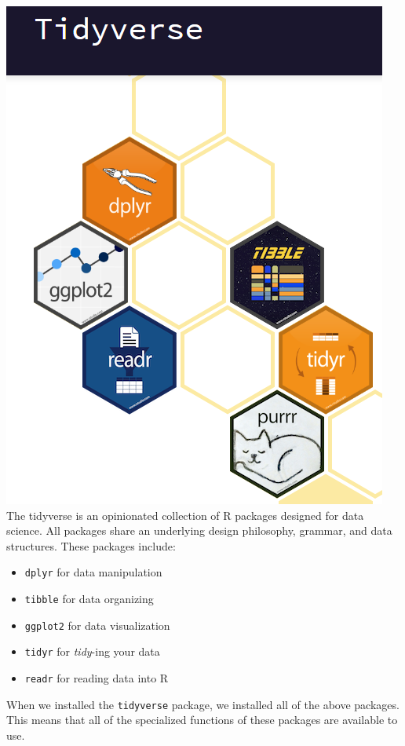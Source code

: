 \documentclass[]{book}
\providecommand{\tightlist}{%
  \setlength{\itemsep}{0pt}\setlength{\parskip}{0pt}}
\begin{document}
\includegraphics{./figures/tidyverse.png}
The tidyverse is an opinionated collection of R packages designed for data science. All packages share an underlying design philosophy, grammar, and data structures. These packages include:

\begin{itemize}
\tightlist
\item
  \texttt{dplyr} for data manipulation
\item
  \texttt{tibble} for data organizing
\item
  \texttt{ggplot2} for data visualization
\item
  \texttt{tidyr} for \emph{tidy}-ing your data
\item
  \texttt{readr} for reading data into R
\end{itemize}

When we installed the \texttt{tidyverse} package, we installed all of the above packages. This means that all of the specialized functions of these packages are available to use.
\end{document}
